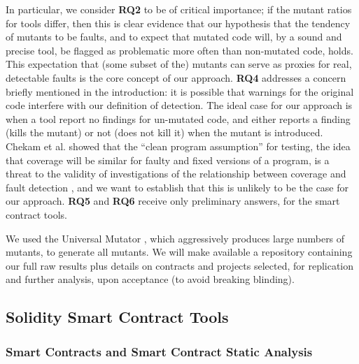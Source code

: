 In particular, we consider {\bf RQ2} to be of critical importance; if the mutant ratios for tools differ, then this is clear evidence that our hypothesis that the tendency of mutants to be faults, and to expect that mutated code will, by a sound and precise tool, be flagged as problematic more often than non-mutated code, holds.  This expectation that (some subset of the) mutants can serve as proxies for real, detectable faults is the core concept of our approach.
{\bf RQ4} addresses a concern briefly mentioned in the introduction:  it is possible that warnings for the original code interfere with our definition of detection.  The ideal case for our approach is when a tool report no findings for un-mutated code, and either reports a finding (kills the mutant) or not (does not kill it) when the mutant is introduced.  Chekam et al. showed that the ``clean program assumption'' for testing, the idea that coverage will be similar for faulty and fixed versions of a program, is a threat to the validity of investigations of the relationship between coverage and fault detection \cite{CleanProgram}, and we want to establish that this is unlikely to be the case for our approach.
{\bf RQ5} and {\bf RQ6} receive only preliminary answers, for the smart contract tools.

We used the Universal Mutator \cite{universalmutator,regexpMut}, which aggressively produces large numbers of mutants, to generate all mutants.  We will make available a repository containing our full raw results plus details on contracts and projects selected, for replication and further analysis, upon acceptance (to avoid breaking blinding).

\subsection{Solidity Smart Contract Tools}

\subsubsection{Smart Contracts and Smart Contract Static Analysis}

